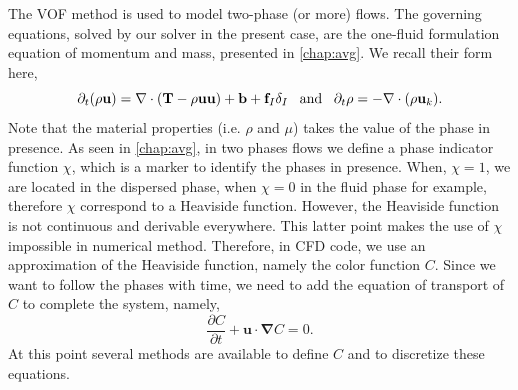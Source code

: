 The VOF method is used to model two-phase (or more) flows. 
The governing equations, solved by our solver in the present case, are the one-fluid formulation equation of momentum and mass, presented in \ref{chap:avg}. 
We recall their form here, 
\begin{equation}
    \partial_t (\rho \textbf{u})
    = \mathbf{\nabla} \cdot (\textbf{T} -\rho  \textbf{u} \textbf{u})
    + \textbf{b}
    + \textbf{f}_I\delta_I
    \;\;\;\text{and}\;\;\;
    \partial_t \rho
    = 
    - \mathbf{\nabla}\cdot(\rho\textbf{u}_k). 
\end{equation}
Note that the material properties (i.e. $\rho$ and $\mu$) takes the value of the phase in presence. 
As seen in \ref{chap:avg}, in two phases flows we define a phase indicator function $\chi$, which is a marker to identify the phases in presence.
When, $\chi = 1$, we are located in the dispersed phase, when $\chi = 0$ in the fluid phase for example, therefore $\chi$ correspond to a Heaviside function. 
However, the Heaviside function is not continuous and derivable everywhere. 
This latter point makes the use of $\chi$ impossible in numerical method.
Therefore, in CFD code, we use an approximation of the Heaviside function, namely the color function $C$. 
Since we want to follow the phases with time,  we need to add the equation of transport of $C$ to complete the system, namely,
\begin{equation}
    \frac{\partial C}{\partial t} + \textbf{u}\cdot\bm{\nabla} C = 0.
    \label{eq:cfunc} 
\end{equation}
At this point several methods are available to define $C$ and to discretize these equations. 

